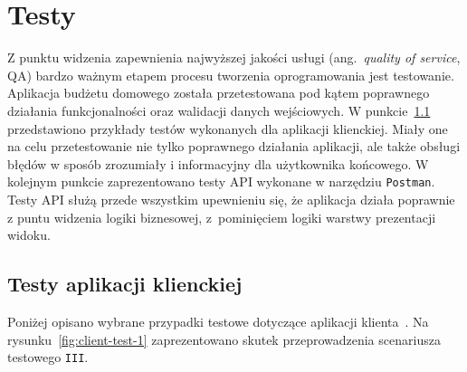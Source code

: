\chapter{Testy}
\label{chap:testy}

Z punktu widzenia zapewnienia najwyższej jakości usługi (ang.~\emph{quality of service}, QA) bardzo ważnym etapem procesu tworzenia oprogramowania jest testowanie. Aplikacja budżetu domowego została przetestowana pod kątem poprawnego działania funkcjonalności oraz walidacji danych wejściowych. W punkcie~\ref{sec:test-client} przedstawiono przykłady testów wykonanych dla aplikacji klienckiej. Miały one na celu przetestowanie nie tylko poprawnego działania aplikacji, ale także obsługi błędów w sposób zrozumiały i informacyjny dla użytkownika końcowego. W kolejnym punkcie zaprezentowano testy API wykonane w narzędziu \texttt{Postman}. Testy API służą przede wszystkim upewnieniu się, że aplikacja działa poprawnie z puntu widzenia logiki biznesowej, z~pominięciem logiki warstwy prezentacji widoku.

\section{Testy aplikacji klienckiej}
\label{sec:test-client}
Poniżej opisano wybrane przypadki testowe dotyczące aplikacji klienta~\cite{test-case}. Na rysunku~\ref{fig:client-test-1} zaprezentowano skutek przeprowadzenia scenariusza testowego \texttt{III}.


